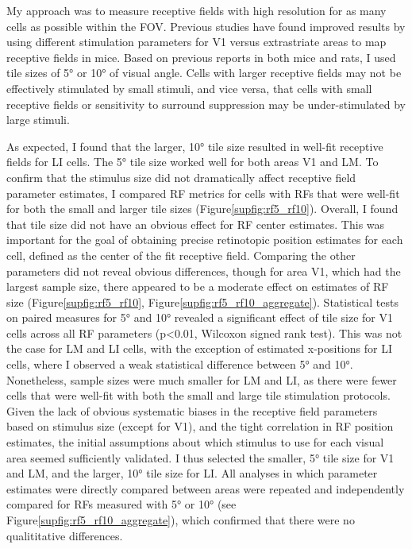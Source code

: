 My approach was to measure receptive fields with high resolution for as many cells as possible within the FOV. Previous studies have found improved results by using different stimulation parameters for V1 versus extrastriate areas to map receptive fields in mice\cite{DeVries2020, Allen2016}. Based on previous reports in both mice and rats\cite{Girman1999a, Niell2008,Vermaercke2014,Tafazoli2017,DeVries2020}, I used tile sizes of \ang{5} or \ang{10} of visual angle. Cells with larger receptive fields may not be effectively stimulated by small stimuli, and vice versa, that cells with small receptive fields or sensitivity to surround suppression may be under-stimulated by large stimuli. 

As expected, I found that the larger, \ang{10} tile size resulted in well-fit receptive fields for LI cells. The \ang{5} tile size worked well for both areas V1 and LM. To confirm that the stimulus size did not dramatically affect receptive field parameter estimates, I compared RF metrics for cells with RFs that were well-fit for both the small and larger tile sizes (Figure\ref{supfig:rf5_rf10}). Overall, I found that tile size did not have an obvious effect for RF center estimates. This was important for the goal of obtaining precise retinotopic position estimates for each cell, defined as the center of the fit receptive field. Comparing the other parameters did not reveal obvious differences, though for area V1, which had the largest sample size, there appeared to be a moderate effect on estimates of RF size (Figure\ref{supfig:rf5_rf10}, Figure\ref{supfig:rf5_rf10_aggregate}). Statistical tests on paired measures for \ang{5} and \ang{10} revealed a significant effect of tile size for V1 cells across all RF parameters (p<0.01, Wilcoxon signed rank test). This was not the case for LM and LI cells, with the exception of estimated x-positions for LI cells, where I observed a weak statistical difference between \ang{5} and \ang{10}. Nonetheless, sample sizes were much smaller for LM and LI, as there were fewer cells that were well-fit with both the small and large tile stimulation protocols. Given the lack of obvious systematic biases in the receptive field parameters based on stimulus size (except for V1), and the tight correlation in RF position estimates, the initial assumptions about which stimulus to use for each visual area seemed sufficiently validated. I thus selected the smaller, \ang{5} tile size for V1 and LM, and the larger, \ang{10} tile size for LI. All analyses in which parameter estimates were directly compared between areas were repeated and independently compared for RFs measured with \ang{5} or \ang{10} (see Figure\ref{supfig:rf5_rf10_aggregate}), which confirmed that there were no qualititative differences. 

